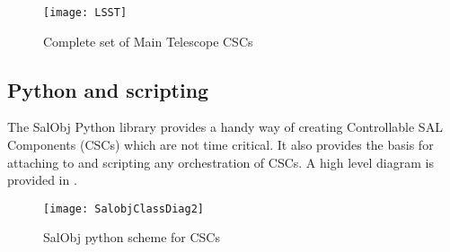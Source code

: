 \begin{figure}
\begin{center}
\texttt{[image: LSST]}
\caption{Complete set of Main Telescope CSCs\label{fig:mtcscs}}
\end{center}
\end{figure}

\subsection{Python and scripting }\label{sect:python}
The SalObj Python library provides a handy way of creating Controllable SAL Components (CSCs) which are not time critical. It also provides the basis for attaching to and scripting any orchestration of CSCs. A high level diagram is provided in .

\begin{figure}
\begin{center}
\texttt{[image: SalobjClassDiag2]}
\caption{SalObj python scheme for  CSCs\label{fig:salobj}}
\end{center}
\end{figure}

